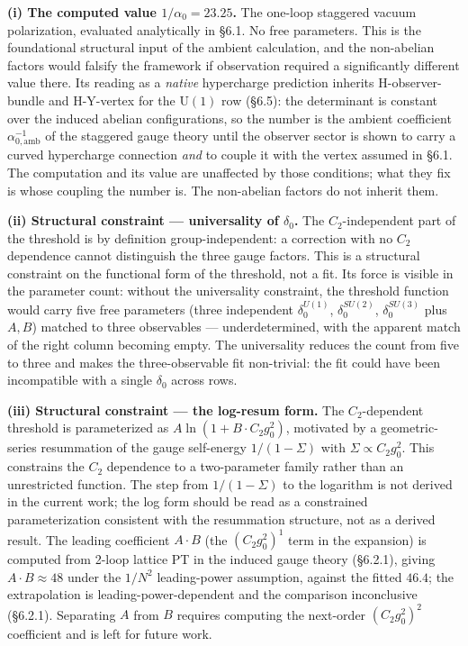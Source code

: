\documentclass[
]{article}
\begin{document}
\textbf{(i) The computed value \(1/\alpha_0 = 23.25\).} The one-loop
staggered vacuum polarization, evaluated analytically in §6.1. No free
parameters. This is the foundational structural input of the ambient
calculation, and the non-abelian factors would falsify the framework if
observation required a significantly different value there. Its reading
as a \emph{native} hypercharge prediction inherits H-observer-bundle and
H-Y-vertex for the \(\mathrm{U}(1)\) row (§6.5): the determinant is
constant over the induced abelian configurations, so the number is the
ambient coefficient \(\alpha^{-1}_{0,\mathrm{amb}}\) of the staggered
gauge theory until the observer sector is shown to carry a curved
hypercharge connection \emph{and} to couple it with the vertex assumed
in §6.1. The computation and its value are unaffected by those
conditions; what they fix is whose coupling the number is. The
non-abelian factors do not inherit them.

\textbf{(ii) Structural constraint --- universality of \(\delta_0\).}
The \(C_2\)-independent part of the threshold is by definition
group-independent: a correction with no \(C_2\) dependence cannot
distinguish the three gauge factors. This is a structural constraint on
the functional form of the threshold, not a fit. Its force is visible in
the parameter count: without the universality constraint, the threshold
function would carry five free parameters (three independent
\(\delta_0^{U(1)}\), \(\delta_0^{SU(2)}\), \(\delta_0^{SU(3)}\) plus
\(A, B\)) matched to three observables --- underdetermined, with the
apparent match of the right column becoming empty. The universality
reduces the count from five to three and makes the three-observable fit
non-trivial: the fit could have been incompatible with a single
\(\delta_0\) across rows.

\textbf{(iii) Structural constraint --- the log-resum form.} The
\(C_2\)-dependent threshold is parameterized as
\(A\ln(1 + B \cdot C_2 g_0^2)\), motivated by a geometric-series
resummation of the gauge self-energy \(1/(1-\Sigma)\) with
\(\Sigma \propto C_2 g_0^2\). This constrains the \(C_2\) dependence to
a two-parameter family rather than an unrestricted function. The step
from \(1/(1-\Sigma)\) to the logarithm is not derived in the current
work; the log form should be read as a constrained parameterization
consistent with the resummation structure, not as a derived result. The
leading coefficient \(A \cdot B\) (the \((C_2 g_0^2)^1\) term in the
expansion) is computed from 2-loop lattice PT in the induced gauge
theory (§6.2.1), giving \(A \cdot B \approx 48\) under the \(1/N^2\)
leading-power assumption, against the fitted \(46.4\); the extrapolation
is leading-power-dependent and the comparison inconclusive (§6.2.1).
Separating \(A\) from \(B\) requires computing the next-order
\((C_2 g_0^2)^2\) coefficient and is left for future work.
\end{document}
